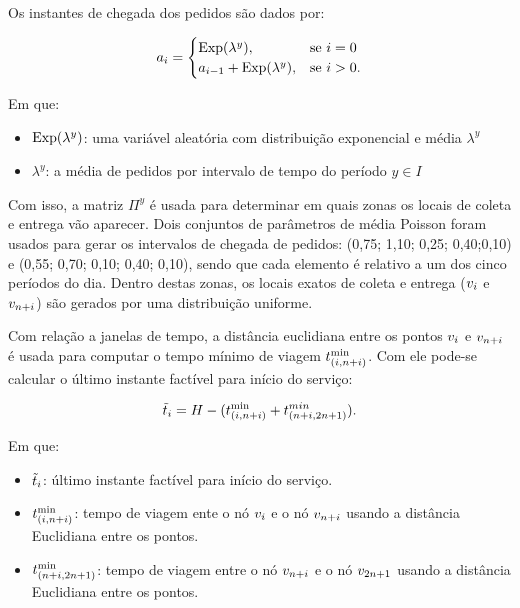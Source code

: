 Os instantes de chegada dos pedidos são dados por:

\begin{equation}
   a_{i} =
   \begin{cases}
       \text{Exp}(\lambda^y),                     & \text{se $i = 0$} \\
       a_{i-1} +\text{Exp}(\lambda^y), & \text{se $i > 0$.}
     \end{cases}
\end{equation}

Em que:
\begin{itemize}
  \item $\text{Exp}(\lambda^y)$: uma variável aleatória com distribuição
    exponencial e média $\lambda^y$
  \item $\lambda^y$: a média de pedidos por intervalo de tempo do período 
    $y \in I$
\end{itemize}

Com isso, a matriz $\Pi^y$ é usada para determinar em quais zonas os locais de 
coleta e entrega vão aparecer. 
Dois conjuntos de parâmetros de média Poisson foram usados para gerar os 
intervalos de chegada de pedidos: (0,75; 1,10; 0,25; 0,40;0,10) e 
(0,55; 0,70; 0,10; 0,40; 0,10), sendo que cada elemento é relativo a
um dos cinco períodos do dia. 
Dentro destas zonas, os locais exatos de coleta e entrega 
($v_{i}$ e $v_{n + i}$) são gerados por uma distribuição uniforme.


Com relação a janelas de tempo, a distância euclidiana entre os pontos 
$v_{i}$ e $v_{n + i}$ é usada para computar o tempo mínimo de 
viagem $t_{(i,n + i)}^{\min}$.
Com ele pode-se calcular o último instante factível para início do serviço:

\begin{equation}
  \Tilde{t}_{i} = H 
    - (t_{(i,n + i)}^{\min} 
    + t_{(n + i,2n + 1)}^{min}).
    \label{eq:gendreau2006_leat_feasible_time}
\end{equation}

Em que:
  \begin{itemize}
  \item $\Tilde{t}_i$: último instante factível para início do serviço.
  \item $t_{(i,n + i)}^{\min}$: tempo de
    viagem ente o nó $v_{i}$ e o nó $v_{n + i}$
    usando a distância Euclidiana entre os pontos.
  \item $t_{(n + i,2n + 1)}^{\min}$: tempo de viagem
    entre o nó $v_{n + i}$ e o nó $v_{2n + 1}$ usando
    a distância Euclidiana entre os pontos.
\end{itemize}


